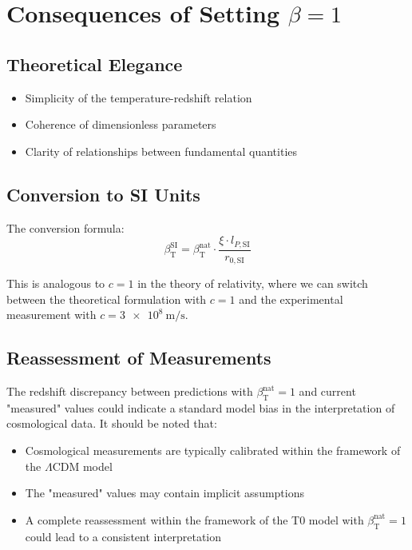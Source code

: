 ﻿\documentclass[12pt,a4paper]{article}
\newcommand{\betaT}{\beta_{\text{T}}}
\begin{document}
	\section{Consequences of Setting \(\beta = 1\)}
	
	\subsection{Theoretical Elegance}
	
	\begin{itemize}
		\item Simplicity of the temperature-redshift relation
		\item Coherence of dimensionless parameters
		\item Clarity of relationships between fundamental quantities
	\end{itemize}
	
	\subsection{Conversion to SI Units}
	
	The conversion formula:
	\begin{equation}
		\betaT^{\text{SI}} = \betaT^{\text{nat}} \cdot \frac{\xi \cdot l_{P,\text{SI}}}{r_{0,\text{SI}}}
	\end{equation}
	
	This is analogous to \(c = 1\) in the theory of relativity, where we can switch between the theoretical formulation with \(c = 1\) and the experimental measurement with \(c = \SI{3e8}{\meter\per\second}\).
	
	\subsection{Reassessment of Measurements}
	
	The redshift discrepancy between predictions with \(\betaT^{\text{nat}} = 1\) and current "measured" values could indicate a standard model bias in the interpretation of cosmological data. It should be noted that:
	\begin{itemize}
		\item Cosmological measurements are typically calibrated within the framework of the \(\Lambda\)CDM model
		\item The "measured" values may contain implicit assumptions
		\item A complete reassessment within the framework of the T0 model with \(\betaT^{\text{nat}} = 1\) could lead to a consistent interpretation
	\end{itemize}
	
\end{document}
